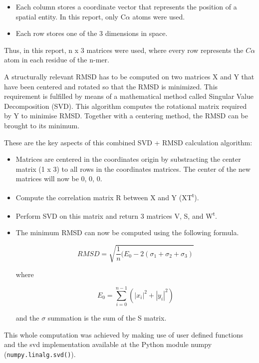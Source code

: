\documentclass[a4paper, 11pt]{article} %
\begin{document}
\begin{itemize}

\item Each column stores a coordinate vector that represents the position of a spatial entity. In this report, only C$\alpha$ atoms were used.

\item Each row stores one of the 3 dimensions in space.
\end{itemize}

Thus, in this report, n x 3 matrices were used, where every row represents the $C\alpha$ atom in each residue of the n-mer.

A structurally relevant RMSD has to be computed on two matrices X and Y that have been centered and rotated so that the RMSD is minimized. This requirement is fulfilled by means of a mathematical method called Singular Value Decomposition (SVD). This algorithm computes the rotational matrix required by Y to minimise RMSD. Together with a centering method, the RMSD can be brought to its minimum.

These are the key aspects of this combined SVD + RMSD calculation algorithm:

\begin{itemize}

\item Matrices are centered in the coordinates origin by substracting the center matrix (1 x 3) to all rows in the coordinates matrices. The center of the new matrices will now be 0, 0, 0.

\item Compute the correlation matrix R between X and Y (XT\textsuperscript{t}).

\item Perform SVD on this matrix and return 3 matrices V, S, and W\textsuperscript{t}.

\item The minimum RMSD can now be computed using the following formula.

$$RMSD = \sqrt { \frac { 1 }{ n }  ( E_0 - 2(\sigma_1 + \sigma_2 + \sigma_3 )}$$

where

$$E_0 = \sum _{ i=0 }^{ n-1 }(|x_i|^{2} + |y_i|^{2})$$

and the $\sigma$ summation is the sum of the S matrix.

\end{itemize}

This whole computation was achieved by making use of user defined functions and the svd implementation available at the Python module numpy (\texttt{numpy.linalg.svd()}).
\end{document}
